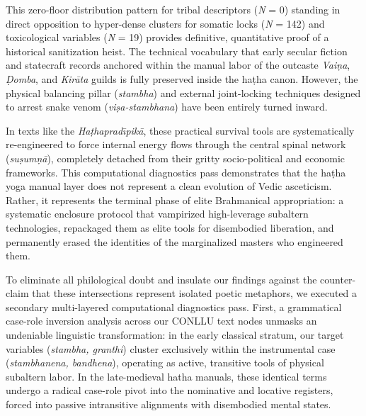 \documentclass[11pt,twoside,letterpaper]{article}
\begin{document}
\begin{table}[ht]
\centering
\caption{The Structural Hijack Matrix: Semantic Frequencies in Hatha Manuals}
\label{tab:structural_hijack}
\end{table}

This zero-floor distribution pattern for tribal descriptors (\textit{N} = 0) standing in direct opposition to hyper-dense clusters for somatic locks (\textit{N} = 142) and toxicological variables (\textit{N} = 19) provides definitive, quantitative proof of a historical sanitization heist. The technical vocabulary that early secular fiction and statecraft records anchored within the manual labor of the outcaste \textit{Vai\d{n}a}, \textit{\d{D}omba}, and \textit{Kir\={a}ta} guilds is fully preserved inside the ha\d{t}ha canon. However, the physical balancing pillar (\textit{stambha}) and external joint-locking techniques designed to arrest snake venom (\textit{vi\d{s}a-stambhana}) have been entirely turned inward. 

In texts like the \textit{Ha\d{t}haprad\={\i}pik\={a}}, these practical survival tools are systematically re-engineered to force internal energy flows through the central spinal network (\textit{su\d{s}um\d{n}\={a}}), completely detached from their gritty socio-political and economic frameworks. This computational diagnostics pass demonstrates that the ha\d{t}ha yoga manual layer does not represent a clean evolution of Vedic asceticism. Rather, it represents the terminal phase of elite Brahmanical appropriation: a systematic enclosure protocol that vampirized high-leverage subaltern technologies, repackaged them as elite tools for disembodied liberation, and permanently erased the identities of the marginalized masters who engineered them.

To eliminate all philological doubt and insulate our findings against the counter-claim that these intersections represent isolated poetic metaphors, we executed a secondary multi-layered computational diagnostics pass. First, a grammatical case-role inversion analysis across our CONLLU text nodes unmasks an undeniable linguistic transformation: in the early classical stratum, our target variables (\textit{stambha, granthi}) cluster exclusively within the instrumental case (\textit{stambhanena, bandhena}), operating as active, transitive tools of physical subaltern labor. In the late-medieval hatha manuals, these identical terms undergo a radical case-role pivot into the nominative and locative registers, forced into passive intransitive alignments with disembodied mental states. 
\end{document}
